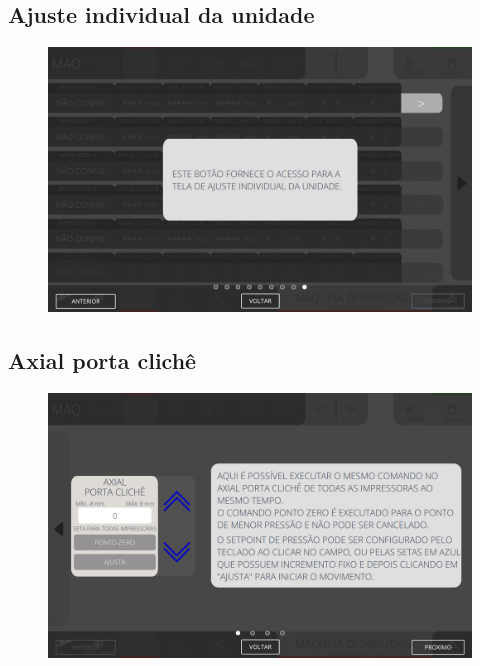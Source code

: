 \newpage
\thispagestyle{fancy}
\vspace*{40 pt}
\subsection{Ajuste individual da unidade}
\vspace*{\fill}
\begin{figure}[h]
    \centering
    \includegraphics[width=576 px,height=360 px]{src/imagesICV/04-printters/01-printters/settings/9.png}
\end{figure}
\vspace*{\fill}

\newpage
\thispagestyle{fancy}
\vspace*{40 pt}
\subsection{Axial porta clichê}
\vspace*{\fill}
\begin{figure}[h]
    \centering
    \includegraphics[width=576 px,height=360 px]{src/imagesICV/04-printters/01-printters/settings/10.png}
\end{figure}
\vspace*{\fill}

